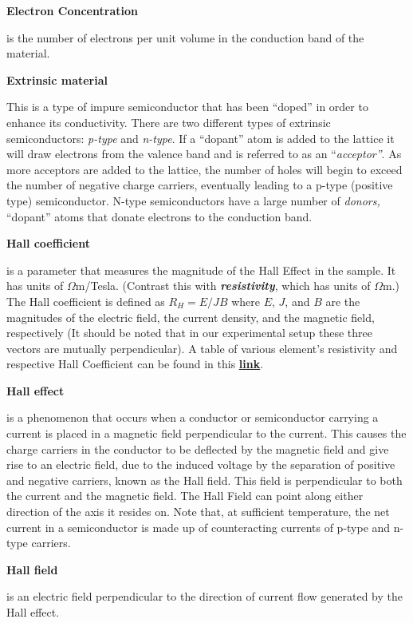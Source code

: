 \documentclass{../lab}
\begin{document}
\textbf{Electron Concentration}

is the number of electrons per unit volume in the conduction band of the material.

\textbf{Extrinsic material}

This is a type of impure semiconductor that has been ``doped'' in order to enhance its conductivity. There are two different types of extrinsic semiconductors: \emph{p-type} and \emph{n-type}. If a ``dopant'' atom is added to the lattice it will draw electrons from the valence band and is referred to as an ``\emph{acceptor''}. As more acceptors are added to the lattice, the number of holes will begin to exceed the number of negative charge carriers, eventually leading to a p-type (positive type) semiconductor. N-type semiconductors have a large number of\emph{ donors,} ``dopant'' atoms that donate electrons to the conduction band.

\textbf{Hall coefficient}

is a parameter that measures the magnitude of the Hall Effect in the sample. It has units of $\Omega$m/Tesla. (Contrast this with \emph{\textbf{resistivity}}, which has units of $\Omega$m.) The Hall coefficient is defined as $R_{H} = E/JB $  where $E$, $J$, and $B$ are the magnitudes of the electric field, the current density, and the magnetic field, respectively (It should be noted that in our experimental setup these three vectors are mutually perpendicular). A table of various element's resistivity and respective Hall Coefficient can be found in this \href{http://experimentationlab.berkeley.edu/sites/default/files/SHE/tableforRH.png}{\textbf{link}}.

\textbf{Hall effect}

is a phenomenon that occurs when a conductor or semiconductor carrying a current is placed in a magnetic field perpendicular to the current. This causes the charge carriers in the conductor to be deflected by the magnetic field and give rise to an electric field, due to the induced voltage by the separation of positive and negative carriers, known as the Hall field. This field is perpendicular to both the current and the magnetic field. The Hall Field can point along either direction of the axis it resides on. Note that, at sufficient temperature, the net current in a semiconductor is made up of counteracting currents of p-type and n-type carriers.

\textbf{Hall field}

is an electric field perpendicular to the direction of current flow generated by the Hall effect.
\end{document}
